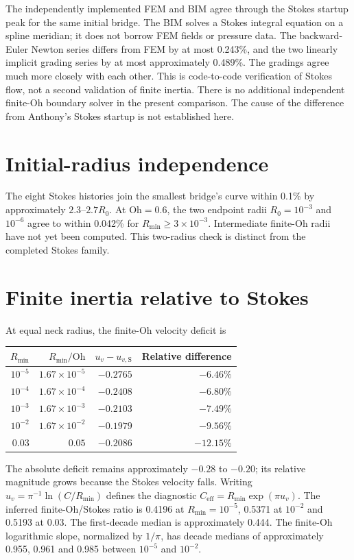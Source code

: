 \documentclass[10pt,a4paper]{article}
\newcommand{\Oh}{\mathrm{Oh}}
\newcommand{\Rmin}{R_{\min}}
\begin{document}
The independently implemented FEM and BIM agree through the Stokes startup
peak for the same initial bridge. The BIM solves a Stokes integral equation
on a spline meridian; it does not borrow FEM fields or pressure data.
The backward-Euler Newton series differs from FEM by at most 0.243\%,
and the two linearly implicit grading series by at most approximately
0.489\%. The gradings agree much more closely with each other.
This is code-to-code verification of Stokes flow, not a second validation
of finite inertia. There is no additional independent finite-Oh boundary
solver in the present comparison. The cause of the difference from
Anthony's Stokes startup is not established here.

\section{Initial-radius independence}

The eight Stokes histories join the smallest bridge's curve within 0.1\%
by approximately $2.3$--$2.7R_0$. At $\Oh=0.6$, the two endpoint radii
$R_0=10^{-3}$ and $10^{-6}$ agree to within 0.042\% for
$\Rmin\geq3\times10^{-3}$. Intermediate finite-Oh radii have not yet
been computed. This two-radius check is distinct from the completed
Stokes family.

\clearpage
\section{Finite inertia relative to Stokes}

At equal neck radius, the finite-Oh velocity deficit is
\begin{center}
\begin{tabular}{rrrr}
\toprule
$\Rmin$ & $\Rmin/\Oh$ & $u_v-u_{v,\mathrm{S}}$ & Relative difference \\
\midrule
$10^{-5}$ & $1.67\times10^{-5}$ & $-0.2765$ & $-6.46\%$ \\
$10^{-4}$ & $1.67\times10^{-4}$ & $-0.2408$ & $-6.80\%$ \\
$10^{-3}$ & $1.67\times10^{-3}$ & $-0.2103$ & $-7.49\%$ \\
$10^{-2}$ & $1.67\times10^{-2}$ & $-0.1979$ & $-9.56\%$ \\
$0.03$ & $0.05$ & $-0.2086$ & $-12.15\%$ \\
\bottomrule
\end{tabular}
\end{center}
The absolute deficit remains approximately $-0.28$ to $-0.20$; its relative
magnitude grows because the Stokes velocity falls. Writing
$u_v=\pi^{-1}\ln(C/\Rmin)$ defines the diagnostic
$C_{\mathrm{eff}}=\Rmin\exp(\pi u_v)$. The inferred finite-Oh/Stokes
ratio is 0.4196 at $\Rmin=10^{-5}$, 0.5371 at $10^{-2}$ and 0.5193 at
$0.03$. The first-decade median is approximately 0.444.
The finite-Oh logarithmic slope, normalized by $1/\pi$, has decade
medians of approximately 0.955, 0.961 and 0.985 between $10^{-5}$ and $10^{-2}$.
\end{document}
